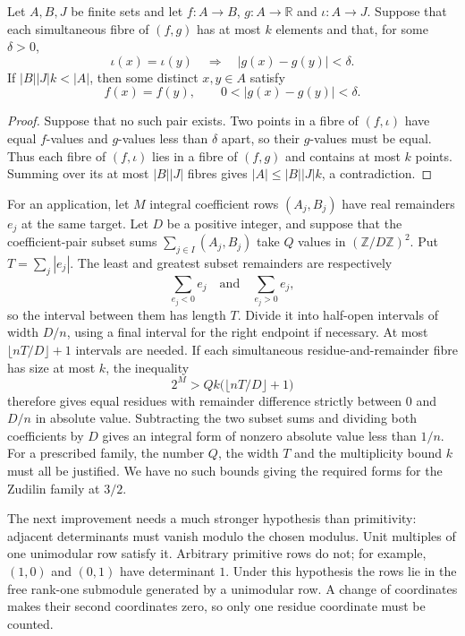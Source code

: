 \documentclass[11pt]{article}
\begin{document}
\begin{theorem}\label{res:boundedfibre}
Let $A,B,J$ be finite sets and let $f:A\to B$, $g:A\to\mathbb R$ and
$\iota:A\to J$.  Suppose that each simultaneous fibre of $(f,g)$ has at
most $k$ elements and that, for some $\delta>0$,
\[
 \iota(x)=\iota(y)\quad\Longrightarrow\quad |g(x)-g(y)|<\delta.
\]
If $|B||J|k<|A|$, then some distinct $x,y\in A$ satisfy
\[
 f(x)=f(y),\qquad 0<|g(x)-g(y)|<\delta.
\]
\end{theorem}
\begin{proof}
Suppose that no such pair exists. Two points in a fibre of
$(f,\iota)$ have equal $f$-values and $g$-values less than $\delta$
apart, so their $g$-values must be equal. Thus each fibre of
$(f,\iota)$ lies in a fibre of $(f,g)$ and contains at most $k$
points. Summing over its at most $|B||J|$ fibres gives
$|A|\le |B||J|k$, a contradiction.
\end{proof}

For an application, let $M$ integral coefficient rows $(A_j,B_j)$ have
real remainders $e_j$ at the same target. Let $D$ be a positive integer,
and suppose that the coefficient-pair subset sums $\sum_{j\in I}(A_j,B_j)$
take $Q$ values in $(\mathbb Z/D\mathbb Z)^2$.
Put $T=\sum_j|e_j|$. The least and greatest
subset remainders are respectively
\[
 \sum_{e_j<0}e_j\quad\text{and}\quad\sum_{e_j>0}e_j,
\]
so the interval between them has length $T$. Divide it into half-open
intervals of width $D/n$, using a final interval for the right
endpoint if necessary. At most $\lfloor nT/D\rfloor+1$ intervals
are needed. If each simultaneous residue-and-remainder fibre has
size at most $k$, the inequality
\[
 2^M>Qk\bigl(\lfloor nT/D\rfloor+1\bigr)
\]
therefore gives equal residues with remainder difference strictly
between $0$ and $D/n$ in absolute value. Subtracting the two subset sums
and dividing both coefficients by $D$ gives an integral form
of nonzero absolute value less than $1/n$. For a prescribed family,
the number $Q$, the width $T$ and the multiplicity bound $k$ must
all be justified. We have no such bounds giving the required forms
for the Zudilin family at $3/2$.


The next improvement needs a much stronger hypothesis than
primitivity: adjacent determinants must vanish modulo the chosen
modulus. Unit multiples of one unimodular row satisfy it. Arbitrary
primitive rows do not; for example, $(1,0)$ and $(0,1)$ have determinant
$1$. Under this hypothesis the rows lie in the free rank-one submodule
generated by a unimodular row. A change of coordinates makes their
second coordinates zero, so only one residue coordinate must be
counted.
\end{document}
